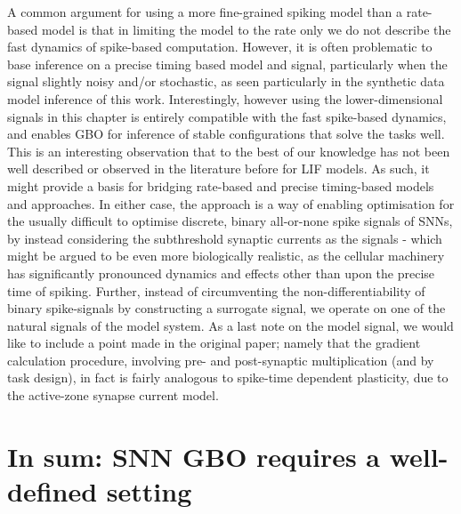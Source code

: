 \documentclass[mphil,deptreport,ianc]{infthesis} %
\begin{document}
A common argument for using a more fine-grained spiking model than a rate-based model is that in limiting the model to the rate only we do not describe the fast dynamics of spike-based computation.
However, it is often problematic to base inference on a precise timing based model and signal, particularly when the signal slightly noisy and/or stochastic, as seen particularly in the synthetic data model inference of this work.
Interestingly, however using the lower-dimensional signals in this chapter is entirely compatible with the fast spike-based dynamics, and enables GBO for inference of stable configurations that solve the tasks well.
This is an interesting observation that to the best of our knowledge has not been well described or observed in the literature before for LIF models.
As such, it might provide a basis for bridging rate-based and precise timing-based models and approaches.
In either case, the approach is a way of enabling optimisation for the usually difficult to optimise discrete, binary all-or-none spike signals of SNNs, by instead considering the subthreshold synaptic currents as the signals - which might be argued to be even more biologically realistic, as the cellular machinery has significantly pronounced dynamics and effects other than upon the precise time of spiking.
Further, instead of circumventing the non-differentiability of binary spike-signals by constructing a surrogate signal, we operate on one of the natural signals of the model system.
As a last note on the model signal, we would like to include a point made in the original paper; namely that the gradient calculation procedure, involving pre- and post-synaptic multiplication (and by task design), in fact is fairly analogous to spike-time dependent plasticity, due to the active-zone synapse current model.





\chapter{In sum: SNN GBO requires a well-defined setting}
\end{document}

